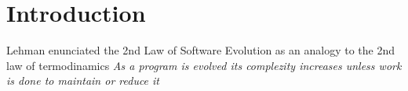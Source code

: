 \section{Introduction}\label{intro}
Lehman \cite{Lehman1979,Lehman1996} enunciated the 2nd Law of Software Evolution as an analogy to the 2nd law of termodinamics \textit{As a program is evolved its complezity increases unless work is done to maintain or reduce it} 
